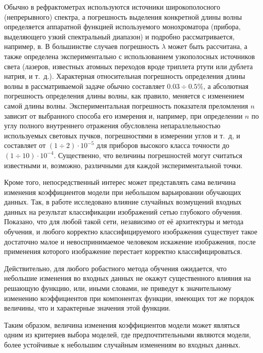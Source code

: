 \documentclass[12pt,a4paper]{article}
\begin{document}
Обычно в рефрактометрах используются источники широкополосного (непрерывного)
спектра, а погрешность выделения конкретной длины волны определяется аппаратной
функцией используемого монохроматора (прибора, выделяющего узкий спектральный
диапазон) и подробно рассматривается, например, в\cite{Malishev79,Zaidel72}.
В большинстве случаев погрешность $\lambda$ может быть рассчитана, а также
определена экспериментально с использованием узкополосных источников света
(лазеров, известных атомных переходов вроде триплета ртути или дублета натрия,
и т.~д.). Характерная относительная погрешность определения длины волны в
рассматриваемой задаче обычно составляет $0.03 \div 0.5\%$, а 
абсолютная погрешность определения длины волны, как правило, меняется с
изменением самой длины волны. Экспериментальная погрешность показателя
преломления $n$ зависит от выбранного способа его измерения и, например,
при определении $n$ по углу полного внутреннего отражения обусловлена
непараллельностью используемых световых пучков, погрешностями в измерении углов
и т.~д, и составляет от $(1 \div 2) \cdot 10^{-5}$ для приборов высокого класса
точности до $(1 \div 10) \cdot 10^{-4}$. Существенно, что величины погрешностей
могут считаться известными и, возможно, различными для каждой экспериментальной точки.

Кроме того, непосредственный интерес может представлять сама величина изменения
коэффициентов модели при небольшом варьировании обучающих данных. Так, в работе \cite{Christian14}
исследовано влияние случайных возмущений входных данных на результат
классификации изображений сетью глубокого обучения. Показано, что для любой такой
сети, независимо от её архитектуры и метода обучения, и любого корректно
классифицируемого изображения существует такое достаточно малое и невоспринимаемое
человеком искажение изображения, после применения которого изображение перестает
корректно классифицироваться.

Действительно, для любого робастного метода обучения ожидается, что небольшие
изменения во входных данных не окажут существенного влияния на решающую функцию,
или, иными словами, не приведут к значительному изменению коэффициентов
при компонентах функции, имеющих тот же порядок величины, что и характерные
значения этой функции.

Таким образом, величина изменения коэффициентов модели может являться одним из
критериев выбора моделей, где предпочтительными являются модели, более устойчивые
к небольшим случайным изменениям во входных данных.
\end{document}
